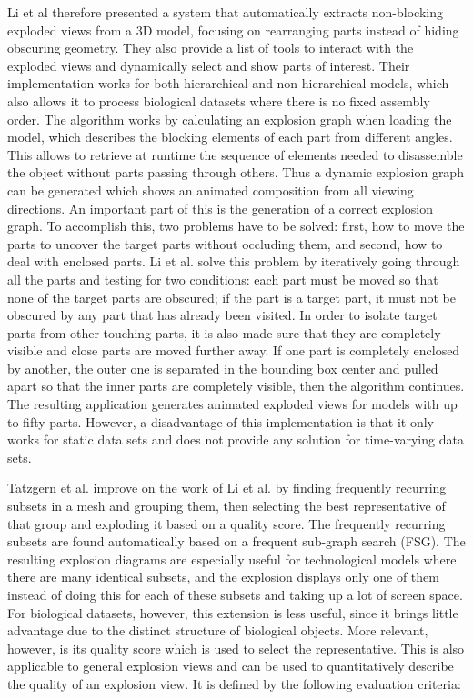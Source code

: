 Li et al therefore presented a system that automatically extracts non-blocking exploded views from a 3D model, focusing on rearranging parts instead of hiding obscuring geometry. %
They also provide a list of tools to interact with the exploded views and dynamically select and show parts of interest.
Their implementation works for both hierarchical and non-hierarchical models, which also allows it to process biological datasets where there is no fixed assembly order.  %
The algorithm works by calculating an explosion graph when loading the model, which describes the blocking elements of each part from different angles. 
This allows to retrieve at runtime the sequence of elements needed to disassemble the object without parts passing through others. 
Thus a dynamic explosion graph can be generated which shows an animated composition from all viewing directions.
An important part of this is the generation of a correct explosion graph. 
To accomplish this, two problems have to be solved: first, how to move the parts to uncover the target parts without occluding them, and second, how to deal with enclosed parts. 
Li et al. solve this problem by iteratively going through all the parts and testing for two conditions: each part must be moved so that none of the target parts are obscured; if the part is a target part, it must not be obscured by any part that has already been visited. 
In order to isolate target parts from other touching parts, it is also made sure that they are completely visible and close parts are moved further away. 
If one part is completely enclosed by another, the outer one is separated in the bounding box center and pulled apart so that the inner parts are completely visible, then the algorithm continues. %
The resulting application generates animated exploded views for models with up to fifty parts. 
However, a disadvantage of this implementation is that it only works for static data sets and does not provide any solution for time-varying data sets.

Tatzgern et al. improve on the work of Li et al. by finding frequently recurring subsets in a mesh and grouping them, then selecting the best representative of that group and exploding it based on a quality score.  %
The frequently recurring subsets are found automatically based on a frequent sub-graph search (FSG). %
The resulting explosion diagrams are especially useful for technological models where there are many identical subsets, and the explosion displays only one of them instead of doing this for each of these subsets and taking up a lot of screen space.  
For biological datasets, however, this extension is less useful, since it brings little advantage due to the distinct structure of biological objects.
More relevant, however, is its quality score which is used to select the representative. This is also applicable to general explosion views and can be used to quantitatively describe the quality of an explosion view. It is defined by the following evaluation criteria: 


